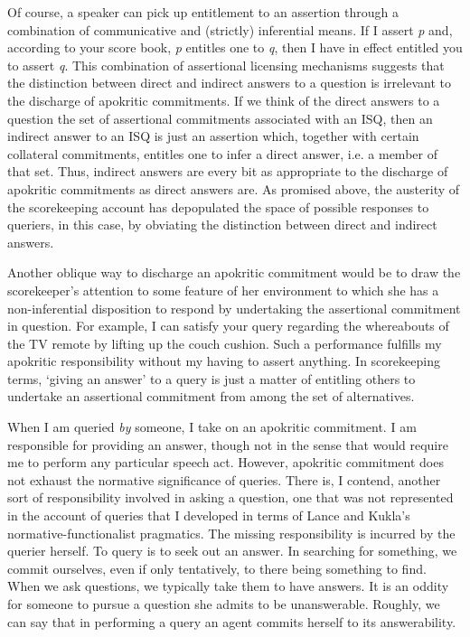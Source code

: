 \documentclass{article}                     %
\begin{document}
Of course, a speaker can pick up entitlement to an assertion through
a combination of communicative and (strictly) inferential means. If
I assert \textit{p} and, according to your score book, \textit{p} entitles one to \textit{q},
then I have in effect entitled you to assert \textit{q}. This combination of
assertional licensing mechanisms suggests that the distinction between
direct and indirect answers to a question is irrelevant to the discharge
of apokritic commitments. If we think of the direct answers to a question the set of assertional commitments associated with
an ISQ, then an indirect answer to an ISQ is just an assertion which,
together with certain collateral commitments, entitles one to infer
a direct answer, i.e. a member of that set. Thus, indirect answers
are every bit as appropriate to the discharge of apokritic commitments
as direct answers are. As promised above, the austerity of the scorekeeping
account has depopulated the space of possible responses to queriers,
in this case, by obviating the distinction between direct and indirect
answers.

Another oblique way to discharge an apokritic commitment would be
to draw the scorekeeper's attention to some feature of her environment
to which she has a non-inferential disposition to respond by undertaking
the assertional commitment in question. For example, I can satisfy
your query regarding the whereabouts of the TV remote by lifting up
the couch cushion. Such a performance fulfills my apokritic responsibility
without my having to assert anything. In scorekeeping terms, `giving
an answer' to a query is just a matter of entitling others to undertake
an assertional commitment from among the set of alternatives. 

When I am queried \emph{by} someone, I take on an apokritic commitment.
I am responsible for providing an answer, though not in the sense
that would require me to perform any particular speech act. However,
apokritic commitment does not exhaust the normative significance of
queries. There is, I contend, another sort of responsibility involved
in asking a question, one that was not represented in the account
of queries that I developed in terms of Lance and Kukla's normative-functionalist
pragmatics. The missing responsibility is incurred by the querier
herself. To query is to seek out an answer. In searching for something,
we commit ourselves, even if only tentatively, to there being something
to find. When we ask questions, we typically take them to have answers.
It is an oddity for someone to pursue a question she admits to be
unanswerable. Roughly, we can say that in performing a query an agent
commits herself to its answerability.
\end{document}
